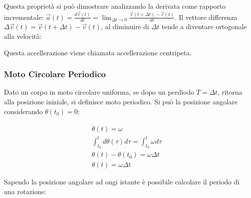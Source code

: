 \documentclass{article}
\numberwithin{equation}{subsection}
\begin{document}
Questa proprietà si può dimostrare analizzando la derivata come 
rapporto incrementale: $\vec{a}(t)=\displaystyle\frac{d\vec{v}(t)}{dt}=
\lim_{\Delta t \to 0}\frac{\vec{v}(t+\Delta t)-\vec{v}(t)}{dt}$.
Il vettore differenza $\Delta \vec{v}(t) =\vec{v}(t+\Delta t)-\vec{v}(t)$, 
al diminuire di $\Delta t$ tende a diventare ortogonale alla velocità:

\begin{center}\end{center}

Questa accellerazione viene chiamata accellerazione centripeta.

\subsubsection{Moto Circolare Periodico}
Dato un corpo in moto circolare uniforma, se dopo un perdiodo 
$T=\Delta t$, ritorna alla posizione iniziale, si definisce moto 
periodico. Si può la posizione angolare considerando 
$\theta(t_0) = 0$: 

\begin{gather}
    \dot\theta(t) = \omega\\
    \int_{t_0}^{t}d\theta(\tau)d\tau=\int_{t_0}^{t}\omega d\tau\\
    \theta(t)-\theta(t_0)=\omega\Delta t\\
    \theta(t)=\omega\Delta t
\end{gather}

Sapendo la posizione angolare ad ongi istante è possibile 
calcolare il periodo di una rotazione:
\end{document}
